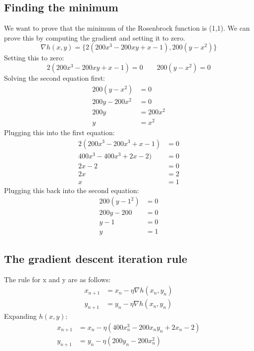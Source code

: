 \documentclass[paper=a4, fontsize=10pt]{scrartcl} %
\numberwithin{equation}{section} %
\numberwithin{figure}{section} %
\numberwithin{table}{section} %
\begin{document}
\subsection{Finding the minimum}
We want to prove that the minimum of the Rosenbrock function is (1,1). We can prove this by computing the gradient and setting it to zero.
\begin{equation}
	\nabla h(x, y) = \{ 2(200x^3 - 200xy + x - 1), 200(y - x^2) \}
\end{equation}
Setting this to zero:
\begin{equation}
	2(200x^3 - 200xy + x - 1) = 0 \qquad 200(y - x^2) = 0
\end{equation}
Solving the second equation first:
\begin{align}
	200(y - x^2) &= 0 \\
	200y - 200x^2 &= 0 \\
	200y &= 200x^2 \\
	y &= x^2 
\end{align}
Plugging this into the first equation:
\begin{align}
	2(200x^3 - 200x^3 + x - 1) &= 0 \\
	400x^3 - 400x^3 + 2x - 2) &= 0 \\
	2x - 2 &= 0 \\
	2x &= 2 \\
	x &= 1
\end{align}
Plugging this back into the second equation:
\begin{align}
200(y - 1^2) &= 0 \\
200y - 200 &= 0 \\
y - 1 &= 0 \\
y &= 1
\end{align}

\subsection{The gradient descent iteration rule}
The rule for x and y are as follows:
\begin{align}
	x_{n+1} &= x_n - \eta \nabla h(x_n,y_n) \\
	y_{n+1} &= y_n - \eta \nabla h(x_n,y_n)
\end{align}
Expanding $h(x, y)$:
\begin{align}
	x_{n+1} &= x_n - \eta (400x_n^3 - 200x_ny_n + 2x_n - 2) \\
	y_{n+1} &= y_n - \eta (200y_n - 200x_n^2)
\end{align}
\end{document}

